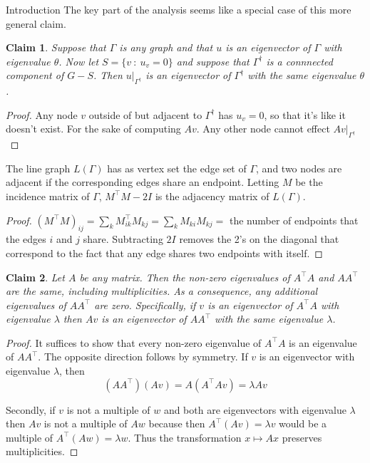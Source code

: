 \documentclass{article}
\newtheorem{claim}{Claim}
\begin{document}
\begin{section}{Introduction}
  The key part of the analysis seems like a special case of this more general claim.
   \begin{claim}
     Suppose that $\Gamma$ is any graph and that $u$ is an eigenvector of $\Gamma$ with eigenvalue $\theta$.
     Now let $S = \{v~:~u_v = 0\}$ and suppose that $\Gamma^\dagger$ is a connnected component of $G-S$.
     Then $u|_{\Gamma^\dagger}$ is an eigenvector of $\Gamma^\dagger$ with the same eigenvalue $\theta$.
   \end{claim}
   \begin{proof}
     Any node $v$ outside of but adjacent to $\Gamma^\dagger$ has $u_v = 0$, so that it's like it doesn't exist. For the sake of computing $Av$.
     Any other node cannot effect $Av|_{\Gamma^\dagger}$
   \end{proof}

   The line graph $L(\Gamma)$ has as vertex set the edge set of $\Gamma$, and two nodes are adjacent if the corresponding edges share an endpoint.
   Letting $M$ be the incidence matrix of $\Gamma$, $M^\intercal M - 2I$ is the adjacency matrix of $L(\Gamma)$.
   \begin{proof}
     $(M^\intercal M)_{ij} = \sum_kM^\intercal_{ik} M_{kj} = \sum_k M_{ki}M_{kj} =$ the number of endpoints that the edges $i$ and $j$ share.
     Subtracting $2I$ removes the 2's on the diagonal that correspond to the fact that any edge shares two endpoints with itself.
   \end{proof}
   \begin{claim}
     Let $A$ be any matrix.
     Then the non-zero eigenvalues of $A^\intercal A$ and $AA^\intercal$ are the same, including multiplicities.
     As a consequence, any additional eigenvalues of $AA^\intercal$ are zero.
     Specifically, if $v$ is an eigenvector of $A^\intercal A$ with eigenvalue $\lambda$ then $Av$ is an eigenvector of $AA^\intercal$ with the same eigenvalue $\lambda$.
   \end{claim}
   \begin{proof}
     It suffices to show that every non-zero eigenvalue of $A^\intercal A$ is an eigenvalue of $AA^\intercal$.
     The opposite direction follows by symmetry.
     If $v$ is an eigenvector with eigenvalue $\lambda$, then
     $$
     (AA^\intercal)(Av) = A(A^\intercal Av) = \lambda Av
     $$

     Secondly, if $v$ is not a multiple of $w$ and both are eigenvectors with eigenvalue $\lambda$ then $Av$ is not a multiple of $Aw$ because then $A^\intercal (Av) = \lambda v$ would be a multiple of $A^\intercal (Aw) = \lambda w$.
     Thus the transformation $x \mapsto Ax$ preserves multiplicities.
   \end{proof}


\end{section}
\end{document}
